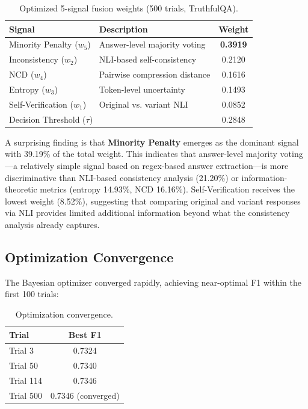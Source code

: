 \begin{table}[!htbp]
    \centering
    \caption{Optimized 5-signal fusion weights (500 trials, TruthfulQA).}
    \label{tab:weights}
    \begin{tabular}{llc}
        \toprule
        Signal & Description & Weight \\
        \midrule
        Minority Penalty ($w_5$) & Answer-level majority voting & \textbf{0.3919} \\
        Inconsistency ($w_2$) & NLI-based self-consistency & 0.2120 \\
        NCD ($w_4$) & Pairwise compression distance & 0.1616 \\
        Entropy ($w_3$) & Token-level uncertainty & 0.1493 \\
        Self-Verification ($w_1$) & Original vs. variant NLI & 0.0852 \\
        \midrule
        \multicolumn{2}{l}{Decision Threshold ($\tau$)} & 0.2848 \\
        \bottomrule
    \end{tabular}
\end{table}

A surprising finding is that \textbf{Minority Penalty} emerges as the dominant signal with 39.19\% of the total weight. This indicates that answer-level majority voting---a relatively simple signal based on regex-based answer extraction---is more discriminative than NLI-based consistency analysis (21.20\%) or information-theoretic metrics (entropy 14.93\%, NCD 16.16\%). Self-Verification receives the lowest weight (8.52\%), suggesting that comparing original and variant responses via NLI provides limited additional information beyond what the consistency analysis already captures.

\subsection{Optimization Convergence}

The Bayesian optimizer converged rapidly, achieving near-optimal F1 within the first 100 trials:

\begin{table}[!htbp]
    \centering
    \caption{Optimization convergence.}
    \begin{tabular}{lc}
        \toprule
        Trial & Best F1 \\
        \midrule
        Trial 3 & 0.7324 \\
        Trial 50 & 0.7340 \\
        Trial 114 & 0.7346 \\
        Trial 500 & 0.7346 (converged) \\
        \bottomrule
    \end{tabular}
\end{table}

